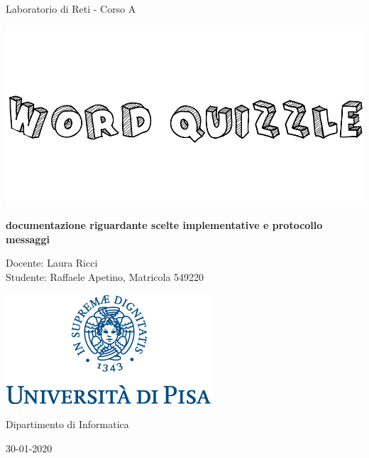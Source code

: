 \documentclass{article}
\begin{document}
\begin{titlepage}
	\centering
	{\large Laboratorio di Reti - Corso A \par}
	\vspace{1.5cm}
	\includegraphics[scale=0.3]{quizzlelogolong.png} \\
	{\large \textbf{documentazione riguardante scelte implementative e protocollo messaggi} \par}
	\vspace{4cm}
	{\large Docente: Laura Ricci \\
	        Studente: Raffaele Apetino, Matricola 549220 \par}
	\vspace{1.3cm}

    \includegraphics[scale=1]{universitapisa.png}
    
    \vspace{1.3cm}
    
	{\normalsize Dipartimento di Informatica \par}
		
	{\normalsize 30-01-2020 \par}
	
	\pagebreak

\end{titlepage}

\tableofcontents{}
\clearpage
\end{document}
